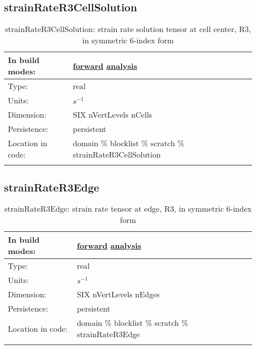\subsection[strainRateR3CellSolution]{strainRateR3CellSolution}
\label{subsec:var_sec_scratch_strainRateR3CellSolution}
\begin{center}
\begin{longtable}{| p{2.0in} | p{4.0in} |}
        \hline 
        In build modes: & \hyperref[subsec:forward_var_tab_scratch]{forward} \hyperref[subsec:analysis_var_tab_scratch]{analysis} \\
        \hline 
        Type: & real \\
        \hline 
        Units: & $s^{-1}$ \\
        \hline 
        Dimension: & SIX nVertLevels nCells \\
        \hline 
        Persistence: & persistent \\
        \hline 
		 Location in code: & domain \% blocklist \% scratch \% strainRateR3CellSolution \\
		 \hline 
    \caption{strainRateR3CellSolution: strain rate solution tensor at cell center, R3, in symmetric 6-index form}
\end{longtable}
\end{center}
\subsection[strainRateR3Edge]{strainRateR3Edge}
\label{subsec:var_sec_scratch_strainRateR3Edge}
\begin{center}
\begin{longtable}{| p{2.0in} | p{4.0in} |}
        \hline 
        In build modes: & \hyperref[subsec:forward_var_tab_scratch]{forward} \hyperref[subsec:analysis_var_tab_scratch]{analysis} \\
        \hline 
        Type: & real \\
        \hline 
        Units: & $s^{-1}$ \\
        \hline 
        Dimension: & SIX nVertLevels nEdges \\
        \hline 
        Persistence: & persistent \\
        \hline 
		 Location in code: & domain \% blocklist \% scratch \% strainRateR3Edge \\
		 \hline 
    \caption{strainRateR3Edge: strain rate tensor at edge, R3, in symmetric 6-index form}
\end{longtable}
\end{center}
